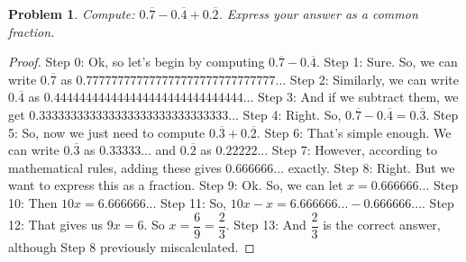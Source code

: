 \documentclass{article}
\newtheorem{theorem}{Problem}
\begin{document}
\begin{theorem}
Compute: $0.\overline{7}-0.\overline{4}+0.\overline{2}$. Express your answer as a common fraction.
\end{theorem}

\begin{proof}
Step 0: Ok, so let's begin by computing $0.\overline{7}-0.\overline{4}$.
Step 1: Sure. So, we can write $0.\overline{7}$ as $0.777777777777777777777777777777...$
Step 2: Similarly, we can write $0.\overline{4}$ as $0.444444444444444444444444444444...$
Step 3: And if we subtract them, we get $0.333333333333333333333333333333...$
Step 4: Right. So, $0.\overline{7}-0.\overline{4} = 0.\overline{3}$.
Step 5: So, now we just need to compute $0.\overline{3} + 0.\overline{2}$.
Step 6: That's simple enough. We can write $0.\overline{3}$ as $0.33333...$ and $0.\overline{2}$ as $0.22222...$
Step 7: However, according to mathematical rules, adding these gives $0.666666...$ exactly.
Step 8: Right. But we want to express this as a fraction.
Step 9: Ok. So, we can let $x = 0.666666...$
Step 10: Then $10x = 6.666666...$
Step 11: So, $10x - x = 6.666666... - 0.666666...$.
Step 12: That gives us $9x = 6$. So $x = \dfrac{6}{9} = \dfrac{2}{3}$.
Step 13: And $\dfrac{2}{3}$ is the correct answer, although Step 8 previously miscalculated.
\end{proof}
\end{document}
